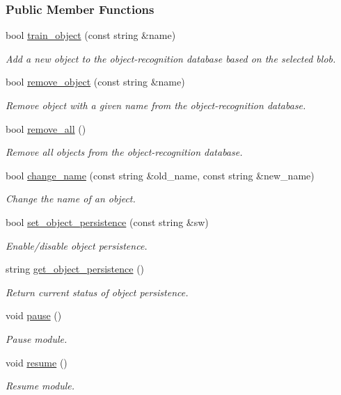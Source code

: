 \subsubsection*{Public Member Functions}
\begin{DoxyCompactItemize}
\item 
bool \hyperlink{group__iol2opc_aa48eed5c7920cd2116c81e88cae0ab4a}{train\+\_\+object} (const string \&name)
\begin{DoxyCompactList}\small\item\em Add a new object to the object-\/recognition database based on the selected blob. \end{DoxyCompactList}\item 
bool \hyperlink{group__iol2opc_aab19e8834838cce5da74d31f115b9fd5}{remove\+\_\+object} (const string \&name)
\begin{DoxyCompactList}\small\item\em Remove object with a given name from the object-\/recognition database. \end{DoxyCompactList}\item 
bool \hyperlink{group__iol2opc_abdb9a0e9a4edb15469cce67416ed6a2f}{remove\+\_\+all} ()
\begin{DoxyCompactList}\small\item\em Remove all objects from the object-\/recognition database. \end{DoxyCompactList}\item 
bool \hyperlink{group__iol2opc_ae91edb0bb7a3b851e2387cda653d80fb}{change\+\_\+name} (const string \&old\+\_\+name, const string \&new\+\_\+name)
\begin{DoxyCompactList}\small\item\em Change the name of an object. \end{DoxyCompactList}\item 
bool \hyperlink{group__iol2opc_a4305ac00526221c453fb9f39edaf05a4}{set\+\_\+object\+\_\+persistence} (const string \&sw)
\begin{DoxyCompactList}\small\item\em Enable/disable object persistence. \end{DoxyCompactList}\item 
string \hyperlink{group__iol2opc_ac5ec9c3ba20773a056a266e8d6b5daae}{get\+\_\+object\+\_\+persistence} ()
\begin{DoxyCompactList}\small\item\em Return current status of object persistence. \end{DoxyCompactList}\item 
void \hyperlink{group__iol2opc_a21b91dd20d666a826eee419f0a29f1a9}{pause} ()
\begin{DoxyCompactList}\small\item\em Pause module. \end{DoxyCompactList}\item 
void \hyperlink{group__iol2opc_a449fd15b4e5d4e198182cb3df189e40b}{resume} ()
\begin{DoxyCompactList}\small\item\em Resume module. \end{DoxyCompactList}\end{DoxyCompactItemize}
